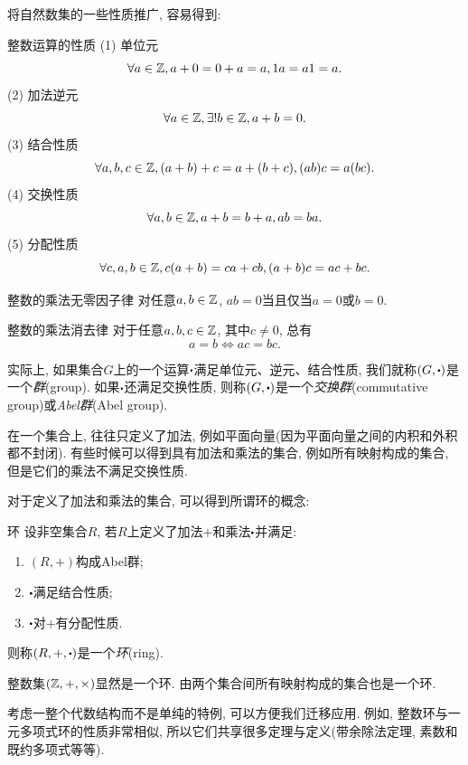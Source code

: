 将自然数集的一些性质推广, 容易得到: 

\begin{proposition}{整数运算的性质}
	(1) 单位元$$\forall a \in \mathbb{Z} ,  a + 0 = 0+ a = a ,  1 a = a 1 = a .$$
	(2) 加法逆元$$\forall a \in \mathbb{Z} ,  \exists ! b \in \mathbb{Z} ,  a + b = 0 .$$
	(3) 结合性质$$\forall a ,  b ,  c \in \mathbb{Z} ,  (a + b) + c = a + (b + c) ,  (a b) c = a (b c) .$$
	(4) 交换性质$$\forall a ,  b \in \mathbb{Z} ,  a + b = b + a ,  a b = b a .$$
	(5) 分配性质$$\forall c ,  a ,  b \in \mathbb{Z} ,  c (a + b) = c a + c b, (a+b)c=ac+bc .$$
\end{proposition}

\begin{proposition}{整数的乘法无零因子律}
	对任意$a, b \in \mathbb{Z}$, $ab=0$当且仅当$a=0$或$b=0$.
\end{proposition}

\begin{corollary}{整数的乘法消去律}
	对于任意$a, b, c \in \mathbb{Z}$, 其中$c \neq 0$, 总有$$a=b \Leftrightarrow ac=bc.$$
\end{corollary}

实际上, 如果集合$G$上的一个运算$\bigcdot$满足单位元、逆元、结合性质, 我们就称$(G,\bigcdot )$是一个\textit{群}(group). 如果$\bigcdot$还满足交换性质, 则称$(G,\bigcdot )$是一个\textit{交换群}(commutative group)或\textit{Abel群}(Abel group).

在一个集合上, 往往只定义了加法, 例如平面向量(因为平面向量之间的内积和外积都不封闭). 有些时候可以得到具有加法和乘法的集合, 例如所有映射构成的集合, 但是它们的乘法不满足交换性质. 

对于定义了加法和乘法的集合, 可以得到所谓环的概念: 

\begin{axiom}{环}
	设非空集合$R$, 若$R$上定义了加法$+$和乘法$\bigcdot$并满足: 
	\begin{enumerate}
		\item $(R,+)$构成Abel群; 
		\item $\bigcdot$满足结合性质; 
		\item $\bigcdot$对$+$有分配性质. 
	\end{enumerate}
	则称$(R,+,\bigcdot )$是一个\textit{环}(ring).
\end{axiom}

整数集$(\mathbb{Z} ,+,\times )$显然是一个环. 由两个集合间所有映射构成的集合也是一个环. 

考虑一整个代数结构而不是单纯的特例, 可以方便我们迁移应用. 例如, 整数环与一元多项式环的性质非常相似, 所以它们共享很多定理与定义(带余除法定理, 素数和既约多项式等等). 

